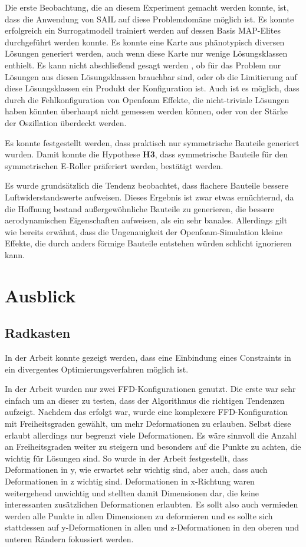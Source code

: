 Die erste Beobachtung, die an diesem Experiment gemacht werden konnte, ist, dass die Anwendung von SAIL auf diese Problemdomäne möglich ist.
Es konnte erfolgreich ein Surrogatmodell trainiert werden auf dessen Basis MAP-Elites durchgeführt werden konnte.
Es konnte eine Karte aus phänotypisch diversen Lösungen generiert werden, auch wenn diese Karte nur wenige Lösungsklassen enthielt.
Es kann nicht abschließend gesagt werden , ob für das Problem nur Lösungen aus diesen Lösungsklassen brauchbar sind, oder ob die Limitierung auf diese Lösungsklassen ein Produkt der Konfiguration ist.
Auch ist es möglich, dass durch die Fehlkonfiguration von Openfoam Effekte, die nicht-triviale Lösungen haben könnten überhaupt nicht gemessen werden können, oder von der Stärke der Oszillation überdeckt werden.

Es konnte festgestellt werden, dass praktisch nur symmetrische Bauteile generiert wurden.
Damit konnte die Hypothese \textbf{H3}, dass symmetrische Bauteile für den symmetrischen E-Roller präferiert werden, bestätigt werden.

Es wurde grundsätzlich die Tendenz beobachtet, dass flachere Bauteile bessere Luftwiderstandswerte aufweisen.
Dieses Ergebnis ist zwar etwas ernüchternd, da die Hoffnung bestand außergewöhnliche Bauteile zu generieren, die bessere aerodynamischen Eigenschaften aufweisen, als ein sehr banales.
Allerdings gilt wie bereits erwähnt, dass die Ungenauigkeit der Openfoam-Simulation kleine Effekte, die durch anders förmige Bauteile entstehen würden schlicht ignorieren kann.

\section{Ausblick}

\subsection{Radkasten}

In der Arbeit konnte gezeigt werden, dass eine Einbindung eines Constraints in ein divergentes Optimierungsverfahren möglich ist.

In der Arbeit wurden nur zwei FFD-Konfigurationen genutzt.
Die erste war sehr einfach um an dieser zu testen, dass der Algorithmus die richtigen Tendenzen aufzeigt.
Nachdem das erfolgt war, wurde eine komplexere FFD-Konfiguration mit Freiheitsgraden gewählt, um mehr Deformationen zu erlauben.
Selbst diese erlaubt allerdings nur begrenzt viele Deformationen.
Es wäre sinnvoll die Anzahl an Freiheitsgraden weiter zu steigern und besonders auf die Punkte zu achten, die wichtig für Lösungen sind.
So wurde in der Arbeit festgestellt, dass Deformationen in y, wie erwartet sehr wichtig sind, aber auch, dass auch Deformationen in z wichtig sind.
Deformationen in x-Richtung waren weitergehend unwichtig und stellten damit Dimensionen dar, die keine interessanten zusätzlichen Deformationen erlaubten.
Es sollt also auch vermieden werden alle Punkte in allen Dimensionen zu deformieren und es sollte sich stattdessen auf y-Deformationen in allen und z-Deformationen in den oberen und unteren Rändern fokussiert werden.

